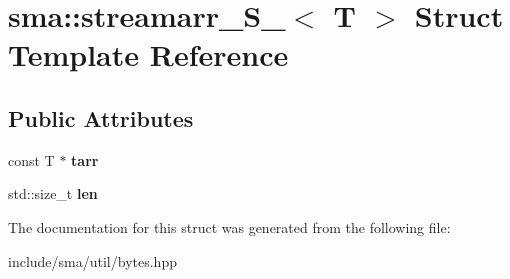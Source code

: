 \hypertarget{structsma_1_1streamarr__S__}{\section{sma\-:\-:streamarr\-\_\-\-S\-\_\-$<$ T $>$ Struct Template Reference}
\label{structsma_1_1streamarr__S__}
}
\subsection*{Public Attributes}
\begin{DoxyCompactItemize}
\item 
\hypertarget{structsma_1_1streamarr__S___ada6cd2fb0726a932d8adfd7adb8a1598}{const T $\ast$ {\bfseries tarr}}\label{structsma_1_1streamarr__S___ada6cd2fb0726a932d8adfd7adb8a1598}

\item 
\hypertarget{structsma_1_1streamarr__S___a07315df0c71896ba565c5a4983df0b56}{std\-::size\-\_\-t {\bfseries len}}\label{structsma_1_1streamarr__S___a07315df0c71896ba565c5a4983df0b56}

\end{DoxyCompactItemize}


The documentation for this struct was generated from the following file\-:\begin{DoxyCompactItemize}
\item 
include/sma/util/bytes.\-hpp\end{DoxyCompactItemize}
